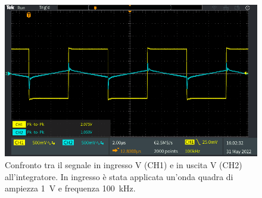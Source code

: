 \begin{figure}[h!]
	\centering
	\includegraphics[width=1\linewidth]{./ImageFiles/Laboratorio 4/TEK00016}
	\caption{Confronto tra il segnale in ingresso V (CH1)  e in uscita V (CH2) all'integratore. In ingresso è stata applicata un'onda quadra di ampiezza \SI{1}{\volt} e frequenza \SI{100}{\kilo\hertz}.}
	\label{fig:opamp_int_quadra}
\end{figure}